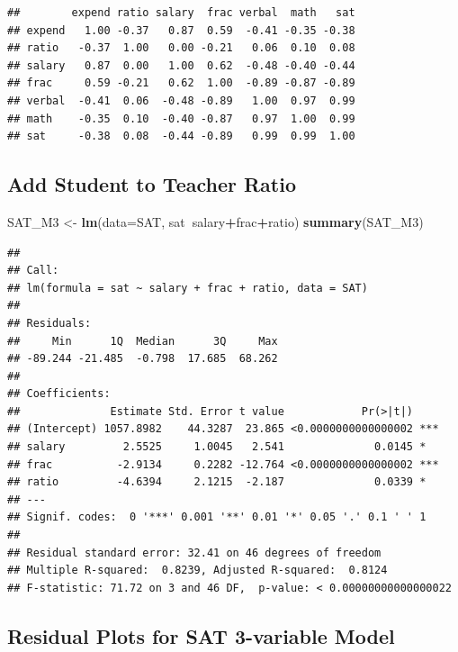 \documentclass[]{book}
\newenvironment{Shaded}{\begin{snugshade}}{\end{snugshade}}
\newcommand{\KeywordTok}[1]{\textcolor[rgb]{0.13,0.29,0.53}{\textbf{#1}}}
\newcommand{\DataTypeTok}[1]{\textcolor[rgb]{0.13,0.29,0.53}{#1}}
\newcommand{\StringTok}[1]{\textcolor[rgb]{0.31,0.60,0.02}{#1}}
\newcommand{\OperatorTok}[1]{\textcolor[rgb]{0.81,0.36,0.00}{\textbf{#1}}}
\newcommand{\NormalTok}[1]{#1}
\begin{document}
\begin{verbatim}
##        expend ratio salary  frac verbal  math   sat
## expend   1.00 -0.37   0.87  0.59  -0.41 -0.35 -0.38
## ratio   -0.37  1.00   0.00 -0.21   0.06  0.10  0.08
## salary   0.87  0.00   1.00  0.62  -0.48 -0.40 -0.44
## frac     0.59 -0.21   0.62  1.00  -0.89 -0.87 -0.89
## verbal  -0.41  0.06  -0.48 -0.89   1.00  0.97  0.99
## math    -0.35  0.10  -0.40 -0.87   0.97  1.00  0.99
## sat     -0.38  0.08  -0.44 -0.89   0.99  0.99  1.00
\end{verbatim}

\subsection{Add Student to Teacher
Ratio}\label{add-student-to-teacher-ratio}

\begin{Shaded}
\begin{Highlighting}[]
\NormalTok{SAT_M3 <-}\StringTok{ }\KeywordTok{lm}\NormalTok{(}\DataTypeTok{data=}\NormalTok{SAT, sat}\OperatorTok{~}\NormalTok{salary}\OperatorTok{+}\NormalTok{frac}\OperatorTok{+}\NormalTok{ratio)}
\KeywordTok{summary}\NormalTok{(SAT_M3)}
\end{Highlighting}
\end{Shaded}

\begin{verbatim}
## 
## Call:
## lm(formula = sat ~ salary + frac + ratio, data = SAT)
## 
## Residuals:
##     Min      1Q  Median      3Q     Max 
## -89.244 -21.485  -0.798  17.685  68.262 
## 
## Coefficients:
##              Estimate Std. Error t value            Pr(>|t|)    
## (Intercept) 1057.8982    44.3287  23.865 <0.0000000000000002 ***
## salary         2.5525     1.0045   2.541              0.0145 *  
## frac          -2.9134     0.2282 -12.764 <0.0000000000000002 ***
## ratio         -4.6394     2.1215  -2.187              0.0339 *  
## ---
## Signif. codes:  0 '***' 0.001 '**' 0.01 '*' 0.05 '.' 0.1 ' ' 1
## 
## Residual standard error: 32.41 on 46 degrees of freedom
## Multiple R-squared:  0.8239, Adjusted R-squared:  0.8124 
## F-statistic: 71.72 on 3 and 46 DF,  p-value: < 0.00000000000000022
\end{verbatim}

\subsection{Residual Plots for SAT 3-variable
Model}\label{residual-plots-for-sat-3-variable-model}
\end{document}
